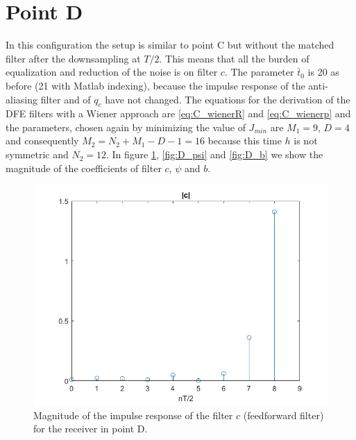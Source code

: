 \documentclass[a4paper,11.5pt]{article}
\begin{document}
\section*{Point D} 

In this configuration the setup is similar to point C but without the matched filter after the downsampling at $T/2$. This means that all the burden of equalization and reduction of the noise is on filter $c$. The parameter $\bar{t}_0$ is 20 as before (21 with Matlab indexing), because the impulse response of the anti-aliasing filter and of $q_c$ have not changed. The equations for the derivation of the DFE filters with a Wiener approach are \ref{eq:C_wienerR} and \ref{eq:C_wienerp} and the parameters, chosen again by minimizing the value of $J_{min}$ are $M_1=9$, $D=4$ and consequently $M_2=N_2+M_1-D-1=16$ because this time $h$ is not symmetric and $N_2=12$. In figure \ref{fig:D_c}, \ref{fig:D_psi} and \ref{fig:D_b} we show the magnitude of the coefficients of filter $c$, $\psi$ and $b$.

\begin{figure}[H]
	\begin{center}   
		\includegraphics[width=\textwidth]{figs/D_c.png} 
		\caption{Magnitude of the impulse response of the filter $c$ (feedforward filter) for the receiver in point D.}
		\label{fig:D_c}
	\end{center}
\end{figure}
\end{document}
